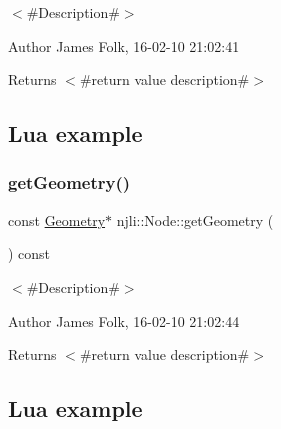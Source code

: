 $<$\#\+Description\#$>$ 

\begin{DoxyAuthor}{Author}
James Folk, 16-\/02-\/10 21\+:02\+:41
\end{DoxyAuthor}
\begin{DoxyReturn}{Returns}
$<$\#return value description\#$>$
\end{DoxyReturn}
\hypertarget{classnjli_1_1_steering_behavior_wander_ex1}{}\subsection{Lua example}\label{classnjli_1_1_steering_behavior_wander_ex1}

\begin{DoxyCodeInclude}
\end{DoxyCodeInclude}
\mbox{\label{classnjli_1_1_node_a973cb392c460b8199aaa59ed4ee63c05}} 
\subsubsection{\texorpdfstring{get\+Geometry()}{getGeometry()}\hspace{0.1cm}{\footnotesize\ttfamily [2/2]}}
{\footnotesize\ttfamily const \mbox{\hyperlink{classnjli_1_1_geometry}{Geometry}}$\ast$ njli\+::\+Node\+::get\+Geometry (\begin{DoxyParamCaption}{ }\end{DoxyParamCaption}) const}



$<$\#\+Description\#$>$ 

\begin{DoxyAuthor}{Author}
James Folk, 16-\/02-\/10 21\+:02\+:44
\end{DoxyAuthor}
\begin{DoxyReturn}{Returns}
$<$\#return value description\#$>$
\end{DoxyReturn}
\hypertarget{classnjli_1_1_steering_behavior_wander_ex1}{}\subsection{Lua example}\label{classnjli_1_1_steering_behavior_wander_ex1}

\begin{DoxyCodeInclude}
\end{DoxyCodeInclude}
\mbox{\label{classnjli_1_1_node_a4e29b0c0c0f159296453314e306f4712}} 

